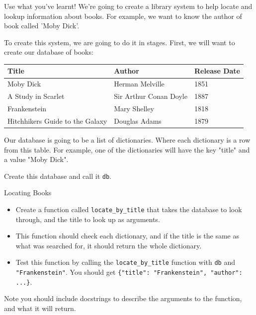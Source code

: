 \documentclass[10pt]{beamer}
\begin{document}
\begin{frame}[label={sec:org3ee0516},fragile]{Use what you've learnt!}
 We're going to create a library system to help locate and lookup information about
books. For example, we want to know the author of book called 'Moby Dick'.

To create this system, we are going to do it in stages. First, we will want to create
our database of books:

\begin{center}
\begin{tabularx}{\textwidth}{XXX}
\toprule
Title & Author & Release Date\\
\midrule
Moby Dick & Herman Melville & 1851\\
A Study in Scarlet & Sir Arthur Conan Doyle & 1887\\
Frankenstein & Mary Shelley & 1818\\
Hitchhikers Guide to the Galaxy & Douglas Adams & 1879\\
\bottomrule
\end{tabularx}
\end{center}

Our database is going to be a list of dictionaries. Where each dictionary is a row
from this table. For example, one of the dictionaries will have the key "title" and a
value "Moby Dick".

Create this database and call it \texttt{db}.
\end{frame}

\begin{frame}[label={sec:org475a184},fragile]{Locating Books}
 \begin{itemize}
\item Create a function called \texttt{locate\_by\_title} that takes the database to look through,
and the title to look up as arguments.
\item This function should check each dictionary, and if the title is the same as what
was searched for, it should return the whole dictionary.
\item Test this function by calling the \texttt{locate\_by\_title} function with \texttt{db} and
\texttt{"Frankenstein"}. You should get \texttt{\{"title": "Frankenstein", "author": ...\}}.
\end{itemize}

\alert{Note} you should include docstrings to describe the arguments to the function, and
what it will return.
\end{frame}
\end{document}
